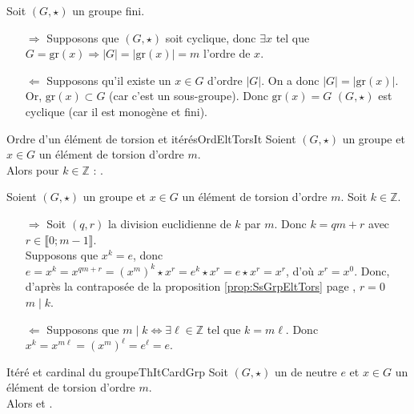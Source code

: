 \documentclass[12pt,a4paper]{report}
\begin{document}
    \begin{demo}
    Soit $(G, \star)$ un groupe fini.
    \begin{itemize}
        \item[$\Rightarrow$] Supposons que $(G, \star)$ soit cyclique, donc $\exists x$ tel que $G = \text{gr}(x) \Rightarrow |G| = |\text{gr}(x)| = m$ l'ordre de $x$.
        \item[$\Leftarrow$] Supposons qu'il existe un $x \in G$ d'ordre $|G|$. On a donc $|G| = |\text{gr}(x)|$. Or, $\text{gr}(x) \subset G$ (car c'est un sous-groupe). Donc $\text{gr}(x) = G$ \ie $(G, \star)$ est cyclique (car il est monogène et fini).
    \end{itemize}
    \end{demo}
    
    \begin{proposition}{Ordre d'un élément de torsion et itérés}{OrdEltTorsIt}
    Soient $(G, \star)$ un groupe et $x \in G$ un élément de torsion d'ordre $m$.\\
    Alors pour $k \in \mathbb{Z}$ : .
    \end{proposition}
    
    \begin{demo}
    Soient $(G, \star)$ un groupe et $x \in G$ un élément de torsion d'ordre $m$. Soit $k \in \mathbb{Z}$.
    \begin{itemize}
        \item[$\Rightarrow$] Soit $(q, r)$ la division euclidienne de $k$ par $m$. Donc $k = qm + r$ avec $r \in  \llbracket 0 ; m-1 \rrbracket$.\\
        Supposons que $x^k = e$, donc $e = x^k = x^{qm + r} = (x^m)^k \star x^r = e^k \star x^r = e \star x^r = x^r$, d'où $x^r = x^0$. Donc, d'après la contraposée de la proposition \ref{prop:SsGrpEltTors} page \pageref{prop:SsGrpEltTors}, $r = 0$ \ie $m \mid k$.
        \item[$\Leftarrow$] Supposons que $m \mid k \Leftrightarrow \exists \ell \in \mathbb{Z}$ tel que $k = m\ell$. Donc $x^k = x^{m\ell} = (x^m)^\ell = e^\ell = e$.
    \end{itemize}
    \end{demo}
    
   \begin{theoreme}{Itéré et cardinal du groupe}{ThItCardGrp}
    Soit $(G, \star)$ un  de neutre $e$ et $x \in G$ un élément de torsion d'ordre $m$.\\
    Alors  et .
    \end{theoreme}
    
\end{document}
